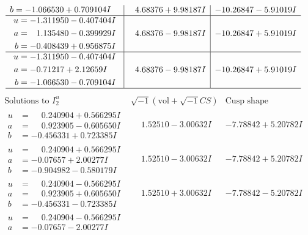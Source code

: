 \documentclass[1p]{elsarticle_modified}
\theoremstyle{definition}
\newcommand{\I}{\sqrt{-1}}
\begin{document}
$$\begin{array}{c|c|c}
\begin{aligned}
b &= -1.066530 + 0.709104 I\end{aligned}
 & \phantom{-}4.68376 + 9.98187 I & -10.26847 - 5.91019 I \\ \hline\begin{aligned}
u &= -1.311950 - 0.407404 I \\
a &= \phantom{-}1.135480 - 0.399929 I \\
b &= -0.408439 + 0.956875 I\end{aligned}
 & \phantom{-}4.68376 - 9.98187 I & -10.26847 + 5.91019 I \\ \hline\begin{aligned}
u &= -1.311950 - 0.407404 I \\
a &= -0.71217 + 2.12659 I \\
b &= -1.066530 - 0.709104 I\end{aligned}
 & \phantom{-}4.68376 - 9.98187 I & -10.26847 + 5.91019 I\\
 \hline 
 \end{array}$$\newpage$$\begin{array}{c|c|c}  
\text{Solutions to }I^u_{2}& \I (\text{vol} + \sqrt{-1}CS) & \text{Cusp shape}\\
 \hline 
\begin{aligned}
u &= \phantom{-}0.240904 + 0.566295 I \\
a &= \phantom{-}0.923905 - 0.605650 I \\
b &= -0.456331 + 0.723385 I\end{aligned}
 & \phantom{-}1.52510 - 3.00632 I & -7.78842 + 5.20782 I \\ \hline\begin{aligned}
u &= \phantom{-}0.240904 + 0.566295 I \\
a &= -0.07657 + 2.00277 I \\
b &= -0.904982 - 0.580179 I\end{aligned}
 & \phantom{-}1.52510 - 3.00632 I & -7.78842 + 5.20782 I \\ \hline\begin{aligned}
u &= \phantom{-}0.240904 - 0.566295 I \\
a &= \phantom{-}0.923905 + 0.605650 I \\
b &= -0.456331 - 0.723385 I\end{aligned}
 & \phantom{-}1.52510 + 3.00632 I & -7.78842 - 5.20782 I \\ \hline\begin{aligned}
u &= \phantom{-}0.240904 - 0.566295 I \\
a &= -0.07657 - 2.00277 I \\

\end{aligned}
\end{array}$$
\end{document}
